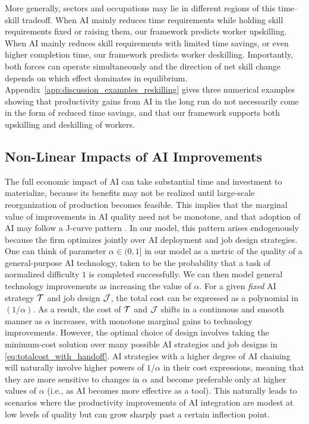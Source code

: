 More generally, sectors and occupations may lie in different regions of this time--skill tradeoff. 
When AI mainly reduces time requirements while holding skill requirements fixed or raising them, our framework predicts worker upskilling. 
When AI mainly reduces skill requirements with limited time savings, or even higher completion time, our framework predicts worker deskilling. 
Importantly, both forces can operate simultaneously and the direction of net skill change depends on which effect dominates in equilibrium. 
Appendix~\ref{app:discussion_examples_reskilling} gives three numerical examples showing that productivity gains from AI in the long run do not necessarily come in the form of reduced time savings, and that our framework supports both upskilling and deskilling of workers.





\subsection{Non-Linear Impacts of AI Improvements}
\label{sec:nonlinear_impact}

The full economic impact of AI can take substantial time and investment to materialize, because its benefits may not be realized until large-scale reorganization of production becomes feasible. 
This implies that the marginal value of improvements in AI quality need not be monotone, and that adoption of AI may follow a J-curve pattern \citep{brynjolfsson2021productivity}. 
In our model, this pattern arises endogenously because the firm optimizes jointly over AI deployment and job design strategies. 
One can think of parameter $\alpha \in (0,1]$ in our model as a metric of the quality of a general-purpose AI technology, taken to be the probability that a task of normalized difficulty $1$ is completed successfully.  
We can then model general technology improvements as increasing the value of $\alpha$.  
For a given \emph{fixed} AI strategy $\mathcal{T}$ and job design $\mathcal{J}$, the total cost can be expressed as a polynomial in $(1/\alpha)$.  
As a result, the cost of $\mathcal{T}$ and $\mathcal{J}$ shifts in a continuous and smooth manner as $\alpha$ increases, with monotone marginal gains to technology improvements.  
However, the optimal choice of design involves taking the minimum-cost solution over many possible AI strategies and job designs in \eqref{eq:totalcost_with_handoff}.  
AI strategies with a higher degree of AI chaining will naturally involve higher powers of $1/\alpha$ in their cost expressions, meaning that they are more sensitive to changes in $\alpha$ and become preferable only at higher values of $\alpha$ (i.e., as AI becomes more effective as a tool). 
This naturally leads to scenarios where the productivity improvements of AI integration are modest at low levels of quality but can grow sharply past a certain inflection point.

